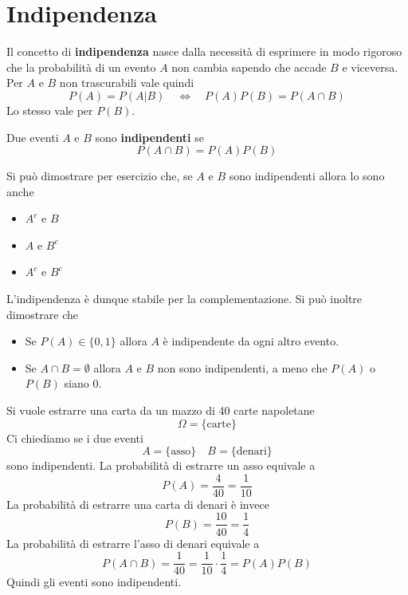\section{Indipendenza}
Il concetto di \textbf{indipendenza} nasce dalla necessità di esprimere in modo rigoroso che la
probabilità di un evento $A$ non cambia sapendo che accade $B$ e viceversa. Per $A$ e $B$ non
trascurabili vale quindi
\[ P(A) = P(A | B) \quad \Leftrightarrow \quad P(A) P(B) = P(A \cap B) \]
Lo stesso vale per $P(B)$.

\begin{definition}
	Due eventi $A$ e $B$ sono \textbf{indipendenti} se
	\[ P(A \cap B) = P(A) P(B) \]
\end{definition}

Si può dimostrare per esercizio che, se $A$ e $B$ sono indipendenti allora lo sono anche
\begin{itemize}
	\item $A^c$ e $B$
	\item $A$ e $B^c$
	\item $A^c$ e $B^c$
\end{itemize}
L'indipendenza è dunque stabile per la complementazione. Si può inoltre dimostrare che
\begin{itemize}
	\item Se $P(A) \in \{ 0, 1 \}$ allora $A$ è indipendente da ogni altro evento.
	\item Se $A \cap B = \emptyset$ allora $A$ e $B$ non sono indipendenti, a meno che $P(A)$ o
	      $P(B)$ siano 0.
\end{itemize}

\begin{example}
	Si vuole estrarre una carta da un mazzo di 40 carte napoletane
	\[ \Omega = \{ \text{carte} \} \]
	Ci chiediamo se i due eventi
	\[ A = \{ \text{asso} \} \quad B = \{ \text{denari} \} \]
	sono indipendenti. La probabilità di estrarre un asso equivale a
	\[ P(A) = \frac{4}{40} = \frac{1}{10} \]
	La probabilità di estrarre una carta di denari è invece
	\[ P(B) = \frac{10}{40} = \frac{1}{4} \]
	La probabilità di estrarre l'asso di denari equivale a
	\[ P(A \cap B) = \frac{1}{40} = \frac{1}{10} \cdot \frac{1}{4} = P(A) P(B) \]
	Quindi gli eventi sono indipendenti.
\end{example}


